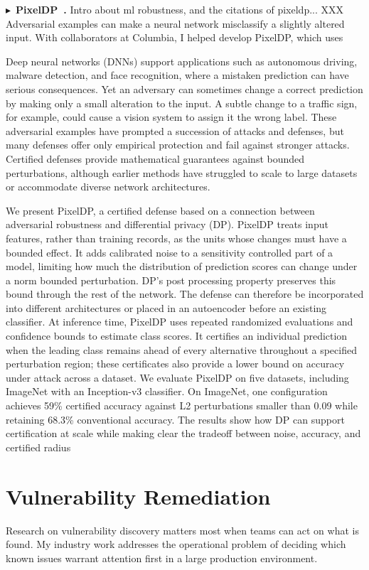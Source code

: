 \documentclass[10pt,letterpaper]{article}
\newcommand{\project}[2]{\par\Needspace{6\baselineskip}\noindent
  $\blacktriangleright$~\textbf{#1~\cite{#2}.}}
\begin{document}
\project{PixelDP}{pixeldp}
Intro about ml robustness, and the citations of pixeldp...
XXX Adversarial examples can make a neural network misclassify a slightly altered
input. With collaborators at Columbia, I helped develop PixelDP, which uses

Deep neural networks (DNNs) support applications such as autonomous driving,
malware detection, and face recognition, where a mistaken prediction can have
serious consequences. Yet an adversary can sometimes change a correct prediction
by making only a small alteration to the input. A subtle change to a traffic
sign, for example, could cause a vision system to assign it the wrong label.
These adversarial examples have prompted a succession of attacks and defenses,
but many defenses offer only empirical protection and fail against stronger
attacks. Certified defenses provide mathematical guarantees against bounded
perturbations, although earlier methods have struggled to scale to large
datasets or accommodate diverse network architectures.

We present PixelDP, a certified defense based on a connection between
adversarial robustness and differential privacy (DP). PixelDP treats input
features, rather than training records, as the units whose changes must have
a bounded effect. It adds calibrated noise to a sensitivity controlled part
of a model, limiting how much the distribution of prediction scores can change
under a norm bounded perturbation. DP's post processing property preserves this
bound through the rest of the network. The defense can therefore be incorporated
into different architectures or placed in an autoencoder before an existing
classifier. At inference time, PixelDP uses repeated randomized evaluations
and confidence bounds to estimate class scores. It certifies an individual
prediction when the leading class remains ahead of every alternative throughout
a specified perturbation region; these certificates also provide a lower bound
on accuracy under attack across a dataset. We evaluate PixelDP on five datasets,
including ImageNet with an Inception-v3 classifier. On ImageNet, one
configuration achieves 59\% certified accuracy against L2 perturbations smaller
than 0.09 while retaining 68.3\% conventional accuracy. The results show how
DP can support certification at scale while making clear the tradeoff between
noise, accuracy, and certified radius


\section{Vulnerability Remediation}
Research on vulnerability discovery matters most when teams can act on what is
found. My industry work addresses the operational problem of deciding which
known issues warrant attention first in a large production environment.
\end{document}
